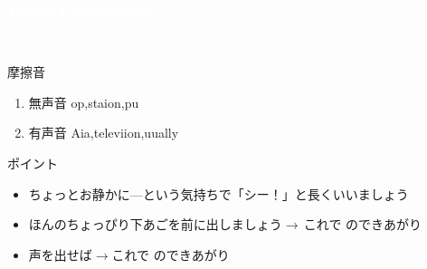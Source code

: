 \documentclass[aspectratio=169,xcolor={dvipsnames,table}]{beamer}
\begin{document}
\begin{frame}
\centering
  \textcolor{white}{\Huge\bfseries Today's Pronunciation}\pause

 \vspace{30pt}

  \textcolor{white}{\Huge\bfseries {}, }
\end{frame}
 \begin{frame}[plain]{摩擦音}

\large

\begin{enumerate}
 \item  無声音 \hspace{20pt}op,\hspace{1\zw}staion,\hspace{1\zw}pu
 \item  有声音 \hspace{20pt}Aia,\hspace{1\zw}televiion,\hspace{1\zw}uually
\end{enumerate}

\vspace*{20pt}

\normalsize
ポイント

\begin{itemize}
 \item ちょっとお静かに---という気持ちで「シー！」と長くいいましょう
 \item ほんのちょっぴり下あごを前に出しましょう$\rightarrow$\,これで\,\,のできあがり 
 \item 声を出せば$\rightarrow$これで\,\,のできあがり
\end{itemize}
\hfill{}
\end{frame}
\end{document}

